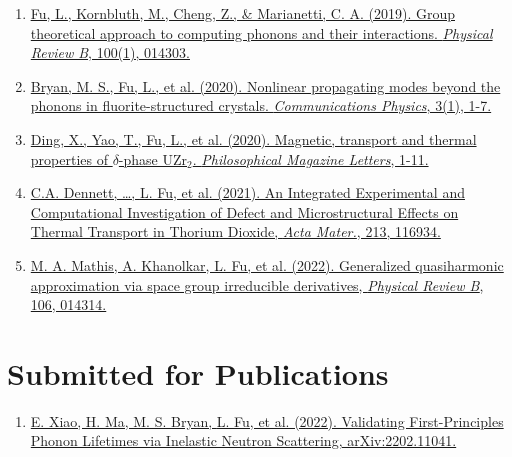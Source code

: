 \documentclass[
  a4paper,
  12pt
]{cv}
\begin{document}
\begin{enumerate}
\item
\href{https://doi.org/10.1103/PhysRevB.100.014303}
{\underline{Fu, L.}, Kornbluth, M., Cheng, Z., \& Marianetti, C. A. (2019). 
Group theoretical approach to computing phonons and their interactions. 
\textit{Physical Review B}, 100(1), 014303.}
%
\item
\href{https://doi.org/10.1038/s42005-020-00483-2}{
Bryan, M. S., \underline{Fu, L.}, et al. (2020). 
Nonlinear propagating modes beyond the phonons in fluorite-structured crystals.
\textit{Communications Physics}, 3(1), 1-7.}
%
\item
\href{https://doi.org/10.1080/09500839.2020.1833375}{
Ding, X., Yao, T., \underline{Fu, L.}, et al. (2020).
Magnetic, transport and thermal properties of $\delta$-phase UZr$_{2}$.
\textit{Philosophical Magazine Letters}, 1-11.
}
%
\item
\href{https://doi.org/10.1016/j.actamat.2021.116934}{
C.A. Dennett, \dots, \underline{L. Fu}, et al. (2021).
An Integrated Experimental and Computational Investigation of Defect and Microstructural Effects on Thermal Transport in Thorium Dioxide, %
\textit{Acta Mater.}, 213, 116934.
}

\item
\href{https://doi.org/10.1103/PhysRevB.106.014314}{
M. A. Mathis, A. Khanolkar, \underline{L. Fu}, et al. (2022).
Generalized quasiharmonic approximation via space group irreducible derivatives,
\textit{Physical Review B}, 106, 014314.
}
%
\end{enumerate}


\section{Submitted for Publications}

\begin{enumerate}
\item
\href{https://arxiv.org/abs/2202.11041}{
E. Xiao, H. Ma, M. S. Bryan, \underline{L. Fu}, et al. (2022).
Validating First-Principles Phonon Lifetimes via Inelastic Neutron Scattering,
arXiv:2202.11041.
}
\end{enumerate}
\end{document}
